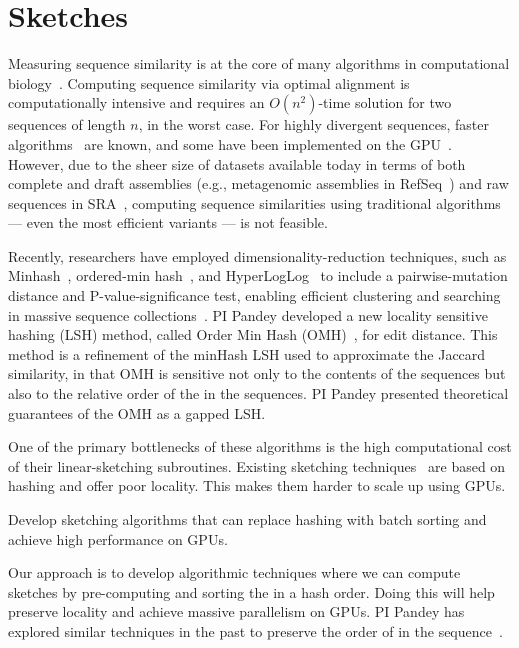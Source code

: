 \section{Sketches}

Measuring sequence similarity is at the core of many algorithms in computational biology~\cite{Myers2000, Langmead2012,Li2010}. Computing sequence similarity via optimal alignment is computationally intensive and requires an $O(n^2)$-time solution for two sequences of length $n$, in the worst case.  For highly divergent sequences, faster algorithms~\cite{MarcoSola2023} are known, and some have been implemented on the GPU~\cite{AguadoPuig2023}. However, due to the sheer size of datasets available today in terms of both complete and draft assemblies (e.g., metagenomic assemblies in RefSeq~\cite{RefSeq}) and raw sequences in SRA~\cite{SRA}, computing sequence similarities using traditional algorithms --- even the most efficient variants --- is not feasible.

Recently, researchers have employed dimensionality-reduction techniques, such as Minhash~\cite{Minhash}, ordered-min hash~\cite{ordered-min-hash}, and HyperLogLog~\cite{HyperLogLog} to include a pairwise-mutation distance and P-value-significance test, enabling  efficient clustering and searching in massive sequence collections~\cite{Mitzenmacher2014,ondov2016mash,Marais2019,Baker2019}. PI Pandey developed a new locality sensitive hashing (LSH) method, called Order Min Hash (OMH)~\cite{Marais2019}, for  edit distance. This method is a refinement of the minHash LSH used to approximate the Jaccard similarity, in that OMH is sensitive not only to the \kmer contents of the sequences but also to the relative order of the \kmers in the sequences. PI Pandey presented theoretical guarantees of the OMH as a gapped LSH\@.

One of the primary bottlenecks of these algorithms is the high computational cost of their linear-sketching subroutines. Existing sketching techniques~\cite{ondov2016mash,Marais2019} are based on hashing and offer poor locality. This makes them harder to scale up using GPUs.

\begin{rproblem}
Develop sketching algorithms that can replace hashing with batch sorting and achieve high performance on GPUs.
\end{rproblem}

Our approach is to develop algorithmic techniques where we can compute sketches by pre-computing and sorting the \kmers in a hash order. Doing this will help preserve locality and achieve massive parallelism on GPUs. PI Pandey has explored similar techniques in the past to preserve the order of \kmers in the sequence~\cite{Marais2019}.

